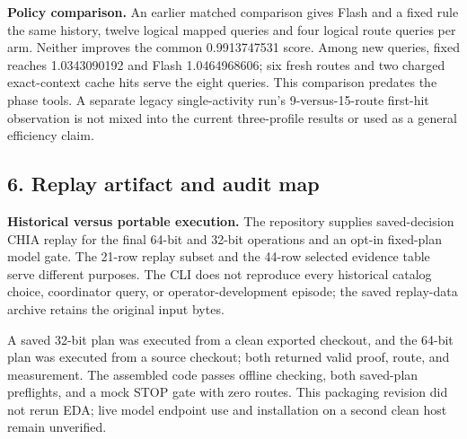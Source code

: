 \documentclass[10pt]{article}
\newcommand{\sect}[1]{\subsection*{#1}}
\begin{document}
\textbf{Policy comparison.} An earlier matched comparison gives Flash and a fixed rule the same history, twelve logical mapped queries and four logical route queries per arm. Neither improves the common 0.9913747531 score. Among new queries, fixed reaches 1.0343090192 and Flash 1.0464968606; six fresh routes and two charged exact-context cache hits serve the eight queries. This comparison predates the phase tools. A separate legacy single-activity run's 9-versus-15-route first-hit observation is not mixed into the current three-profile results or used as a general efficiency claim.

\newpage
\sect{6. Replay artifact and audit map}
\textbf{Historical versus portable execution.} The repository supplies saved-decision CHIA replay for the final 64-bit and 32-bit operations and an opt-in fixed-plan model gate. The 21-row replay subset and the 44-row selected evidence table serve different purposes. The CLI does not reproduce every historical catalog choice, coordinator query, or operator-development episode; the saved replay-data archive retains the original input bytes.

A saved 32-bit plan was executed from a clean exported checkout, and the 64-bit plan was executed from a source checkout; both returned valid proof, route, and measurement. The assembled code passes offline checking, both saved-plan preflights, and a mock STOP gate with zero routes. This packaging revision did not rerun EDA; live model endpoint use and installation on a second clean host remain unverified.
\end{document}

